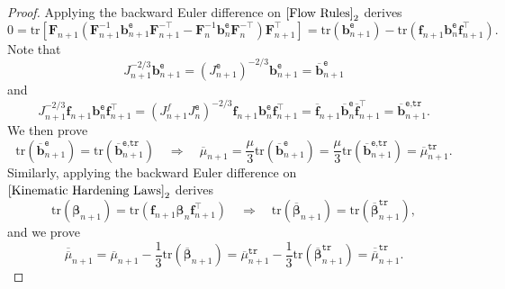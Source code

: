 \documentclass[preprint,11pt]{elsarticle}
\theoremstyle{definition}
\begin{document}
\begin{proof}
Applying the backward Euler difference on $\eqref{Flow Rules}_2$ derives
\begin{equation*}
    0 = \text{tr} \left[ \mathbf{F}_{n+1} \left( \mathbf{F}_{n+1}^{-1} \mathbf{b}_{n+1}^\texttt{e} \mathbf{F}_{n+1}^{-\top} - \mathbf{F}_n^{-1} \mathbf{b}_n^\texttt{e} \mathbf{F}_n^{-\top} \right) \mathbf{F}_{n+1}^\top \right]
    = \text{tr} \left( \mathbf{b}_{n+1}^\texttt{e} \right) - \text{tr} \left( \mathbf{f}_{n+1} \mathbf{b}_n^\texttt{e} \mathbf{f}_{n+1}^\top \right).
\end{equation*}
Note that
\begin{equation*}
    J_{n+1}^{-2/3} \mathbf{b}_{n+1}^\texttt{e} = (J_{n+1}^\texttt{e})^{-2/3} \mathbf{b}_{n+1}^\texttt{e} = \overline{\mathbf{b}}_{n+1}^\texttt{e}
\end{equation*}
and
\begin{equation*}
    J_{n+1}^{-2/3} \mathbf{f}_{n+1} \mathbf{b}_n^\texttt{e} \mathbf{f}_{n+1}^\top = \left( J_{n+1}^f J_n^\texttt{e} \right)^{-2/3} \mathbf{f}_{n+1} \mathbf{b}_n^\texttt{e} \mathbf{f}_{n+1}^\top = \overline{\mathbf{f}}_{n+1} \overline{\mathbf{b}}_n^\texttt{e} \overline{\mathbf{f}}_{n+1}^\top = \overline{\mathbf{b}}_{n+1}^\texttt{e,tr}.
\end{equation*}
We then prove
\begin{equation*}
    \text{tr} \left( \overline{\mathbf{b}}_{n+1}^\texttt{e} \right)
    = \text{tr} \left( \overline{\mathbf{b}}_{n+1}^\texttt{e,tr} \right)
    \quad \Rightarrow \quad
    \overline{\mu}_{n+1} = \dfrac{\mu}{3} \text{tr} \left( \overline{\mathbf{b}}_{n+1}^\texttt{e} \right) = \dfrac{\mu}{3} \text{tr} \left( \overline{\mathbf{b}}_{n+1}^\texttt{e,tr} \right) = \overline{\mu}_{n+1}^\texttt{tr}.
\end{equation*}
Similarly, applying the backward Euler difference on $\eqref{Kinematic Hardening Laws}_2$ derives
\begin{equation*}
    \text{tr} \left( \boldsymbol{\beta}_{n+1} \right) = \text{tr} \left( \mathbf{f}_{n+1} \boldsymbol{\beta}_n \mathbf{f}_{n+1}^\top \right)
    \quad \Rightarrow \quad
    \text{tr} \left( \overline{\boldsymbol{\beta}}_{n+1} \right) = \text{tr} \left( \overline{\boldsymbol{\beta}}_{n+1}^\texttt{tr} \right),
\end{equation*}
and we prove
\begin{equation*}
    \overline{\overline{\mu}}_{n+1} = \overline{\mu}_{n+1} - \dfrac{1}{3} \text{tr} \left( \overline{\boldsymbol{\beta}}_{n+1} \right) = \overline{\mu}_{n+1}^\texttt{tr} - \dfrac{1}{3} \text{tr} \left( \overline{\boldsymbol{\beta}}_{n+1}^\texttt{tr} \right) = \overline{\overline{\mu}}_{n+1}^\texttt{tr}.
\end{equation*}
\end{proof}
\end{document}
